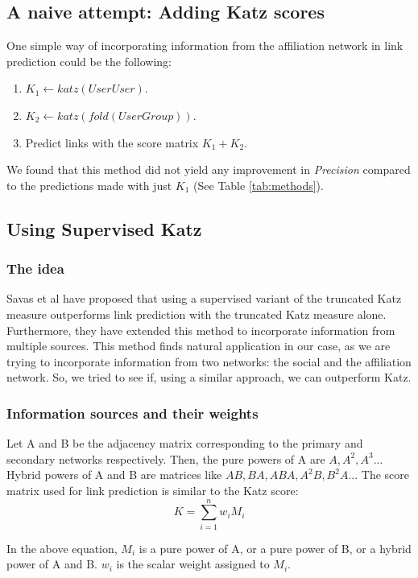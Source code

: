 \documentclass{report}
\begin{document}
\subsection{A naive attempt: Adding Katz scores}
One simple way of incorporating information from the affiliation network in link prediction could be the following: 
\begin{enumerate}
 \item $K_1 \gets katz(UserUser)$.
 \item $K_2 \gets katz(fold(UserGroup))$.
 \item Predict links with the score matrix $K_1 + K_2$.
\end{enumerate}

We found that this method did not yield any improvement in \textit{Precision} compared to the predictions made with just $K_1$ (See Table \ref{tab:methods}).

\subsection{Using Supervised Katz}
\subsubsection{The idea}
Savas et al\cite{savasLinkPred} have proposed that using a supervised variant of the truncated Katz measure outperforms link prediction with the truncated Katz measure alone. Furthermore, they have extended this method to incorporate information from multiple sources. This method finds natural application in our case, as we are trying to incorporate information from two networks: the social and the affiliation network. So, we tried to see if, using a similar approach, we can outperform Katz.

\subsubsection{Information sources and their weights}
Let A and B be the adjacency matrix corresponding to the primary and secondary networks respectively. Then, the pure powers of A are $A, A^{2}, A^{3} ..$. Hybrid powers of A and B are matrices like $AB, BA, ABA, A^{2}B, B^{2}A .. $. The score matrix used for link prediction is similar to the Katz score:
\begin{equation*}
K = \sum_{i=1}^{n}w_i M_i
\end{equation*}

In the above equation, $M_i$ is a pure power of A, or a pure power of B, or a hybrid power of A and B. $w_i$ is the scalar weight assigned to $M_i$.
\end{document}
